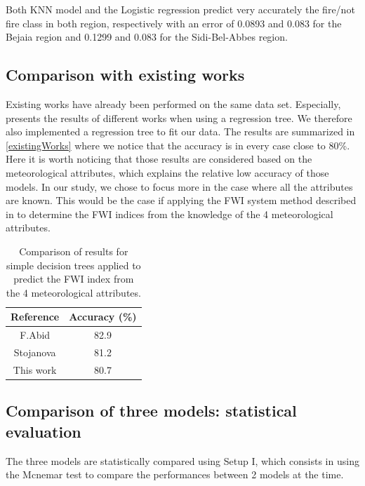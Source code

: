\documentclass[10pt]{article}
\numberwithin{equation}{section}
\numberwithin{figure}{section}
\numberwithin{table}{section}
\begin{document}
Both KNN model and the Logistic regression predict very accurately the fire/not fire class in both region, respectively with an error of 0.0893 and 0.083 for the Bejaia region and 0.1299 and 0.083 for the Sidi-Bel-Abbes region.



\subsection{Comparison with existing works}

Existing works have already been performed on the same data set. Especially, \cite{article} presents the results of different works when using a regression tree. We therefore also implemented a regression tree to fit our data. The results are summarized in \autoref{existingWorks} where we notice that the accuracy is in every case close to 80\%. Here it is worth noticing that those results are considered based on the meteorological attributes, which explains the relative low accuracy of those models. In our study, we chose to focus more in the case where all the attributes are known. This would be the case if applying the FWI system method described in \cite{FWI_Wagner} to determine the FWI indices from the knowledge of the 4 meteorological attributes.

\begin{table}[H]
\centering
\begin{tabular}{|c|c|}
\hline
\textbf{Reference} & \textbf{Accuracy (\%)} \\ \hline
F.Abid             & 82.9                   \\ \hline
Stojanova          & 81.2                   \\ \hline
This work          & 80.7                   \\ \hline
\end{tabular}
\caption{Comparison of results for simple decision trees applied to predict the FWI index from the 4 meteorological attributes.}
\label{existingWorks}
\end{table}






\subsection{Comparison of three models: statistical evaluation}
The three models are statistically compared using Setup I, which consists in using the Mcnemar test to compare the performances between 2 models at the time.
\end{document}
